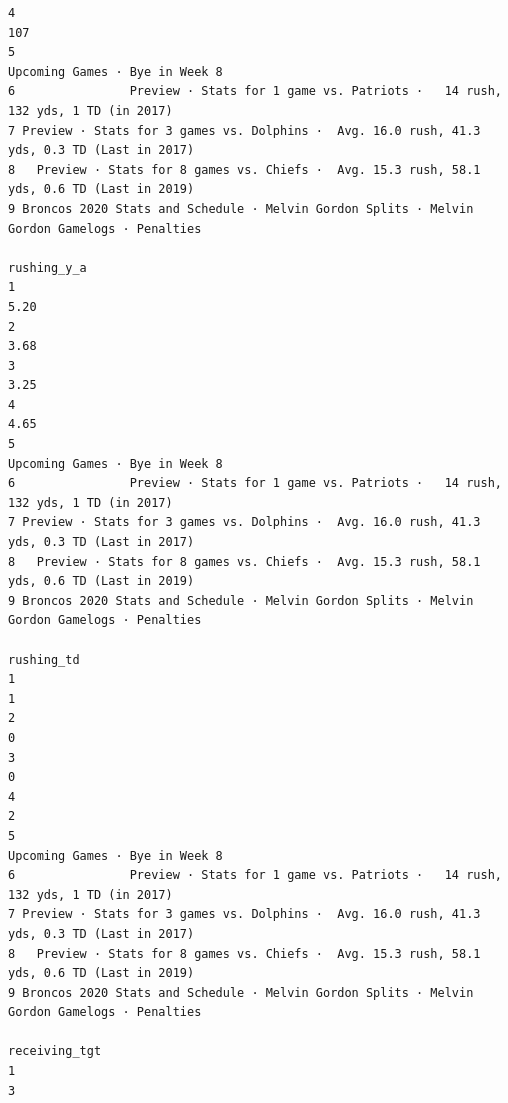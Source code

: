 \documentclass[
]{article}
\begin{document}
\begin{verbatim}
4                                                                                         107
5                                                              Upcoming Games · Bye in Week 8
6                Preview · Stats for 1 game vs. Patriots ·   14 rush, 132 yds, 1 TD (in 2017)
7 Preview · Stats for 3 games vs. Dolphins ·  Avg. 16.0 rush, 41.3 yds, 0.3 TD (Last in 2017)
8   Preview · Stats for 8 games vs. Chiefs ·  Avg. 15.3 rush, 58.1 yds, 0.6 TD (Last in 2019)
9 Broncos 2020 Stats and Schedule · Melvin Gordon Splits · Melvin Gordon Gamelogs · Penalties
                                                                                  rushing_y_a
1                                                                                        5.20
2                                                                                        3.68
3                                                                                        3.25
4                                                                                        4.65
5                                                              Upcoming Games · Bye in Week 8
6                Preview · Stats for 1 game vs. Patriots ·   14 rush, 132 yds, 1 TD (in 2017)
7 Preview · Stats for 3 games vs. Dolphins ·  Avg. 16.0 rush, 41.3 yds, 0.3 TD (Last in 2017)
8   Preview · Stats for 8 games vs. Chiefs ·  Avg. 15.3 rush, 58.1 yds, 0.6 TD (Last in 2019)
9 Broncos 2020 Stats and Schedule · Melvin Gordon Splits · Melvin Gordon Gamelogs · Penalties
                                                                                   rushing_td
1                                                                                           1
2                                                                                           0
3                                                                                           0
4                                                                                           2
5                                                              Upcoming Games · Bye in Week 8
6                Preview · Stats for 1 game vs. Patriots ·   14 rush, 132 yds, 1 TD (in 2017)
7 Preview · Stats for 3 games vs. Dolphins ·  Avg. 16.0 rush, 41.3 yds, 0.3 TD (Last in 2017)
8   Preview · Stats for 8 games vs. Chiefs ·  Avg. 15.3 rush, 58.1 yds, 0.6 TD (Last in 2019)
9 Broncos 2020 Stats and Schedule · Melvin Gordon Splits · Melvin Gordon Gamelogs · Penalties
                                                                                receiving_tgt
1                                                                                           3

\end{verbatim}
\end{document}

